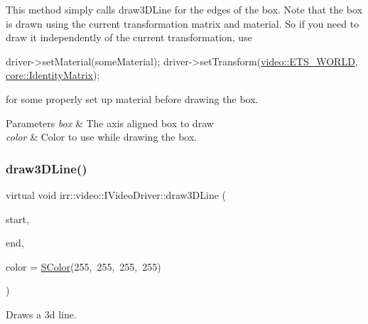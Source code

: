This method simply calls draw3\+D\+Line for the edges of the box. Note that the box is drawn using the current transformation matrix and material. So if you need to draw it independently of the current transformation, use 
\begin{DoxyCode}
driver->setMaterial(someMaterial);
driver->setTransform(\hyperlink{namespaceirr_1_1video_a15b57657a320243be03ae6f66fcff43daf0d9765331daace35b8443c471738305}{video::ETS\_WORLD}, \hyperlink{namespaceirr_1_1core_ac4561f3920d3fbfbfff74c9bed1f2713}{core::IdentityMatrix});
\end{DoxyCode}
 for some properly set up material before drawing the box. 
\begin{DoxyParams}{Parameters}
{\em box} & The axis aligned box to draw \\
\hline
{\em color} & Color to use while drawing the box. \\
\hline
\end{DoxyParams}
\mbox{\label{classirr_1_1video_1_1IVideoDriver_a5e4e03dca1720f3d2019b73a4eebb5e6}} 
\subsubsection{\texorpdfstring{draw3\+D\+Line()}{draw3DLine()}\hspace{0.1cm}{\footnotesize\ttfamily [1/2]}}
{\footnotesize\ttfamily virtual void irr\+::video\+::\+I\+Video\+Driver\+::draw3\+D\+Line (\begin{DoxyParamCaption}\item[{const \hyperlink{namespaceirr_1_1core_ae6e2b2a6c552833ebbd5b7463d03586b}{core\+::vector3df} \&}]{start,  }\item[{const \hyperlink{namespaceirr_1_1core_ae6e2b2a6c552833ebbd5b7463d03586b}{core\+::vector3df} \&}]{end,  }\item[{\hyperlink{classirr_1_1video_1_1SColor}{S\+Color}}]{color = {\ttfamily \hyperlink{classirr_1_1video_1_1SColor}{S\+Color}(255,~255,~255,~255)} }\end{DoxyParamCaption})\hspace{0.3cm}{\ttfamily [pure virtual]}}



Draws a 3d line. 

